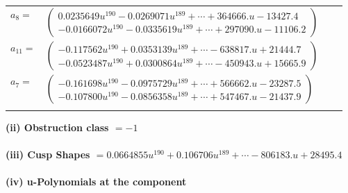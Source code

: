 \documentclass[1p]{elsarticle_modified}
\theoremstyle{definition}
\begin{document}
\begin{tabular}{m{7pt} m{180pt} m{7pt} m{180pt} }
\flushright $a_{8}=$&$\begin{pmatrix}0.0235649 u^{190}-0.0269071 u^{189}+\cdots+364666. u-13427.4\\-0.0166072 u^{190}-0.0335619 u^{189}+\cdots+297090. u-11106.2\end{pmatrix}$ \\
\flushright $a_{11}=$&$\begin{pmatrix}-0.117562 u^{190}+0.0353139 u^{189}+\cdots-638817. u+21444.7\\-0.0523487 u^{190}+0.0300864 u^{189}+\cdots-450943. u+15665.9\end{pmatrix}$ \\
\flushright $a_{7}=$&$\begin{pmatrix}-0.161698 u^{190}-0.0975729 u^{189}+\cdots+566662. u-23287.5\\-0.107800 u^{190}-0.0856358 u^{189}+\cdots+547467. u-21437.9\end{pmatrix}$\\&\end{tabular}
\flushleft \textbf{(ii) Obstruction class $= -1$}\\~\\
\flushleft \textbf{(iii) Cusp Shapes $= 0.0664855 u^{190}+0.106706 u^{189}+\cdots-806183. u+28495.4$}\\~\\
\newpage\renewcommand{\arraystretch}{1}
\flushleft \textbf{(iv) u-Polynomials at the component}\newline \\
\end{document}
